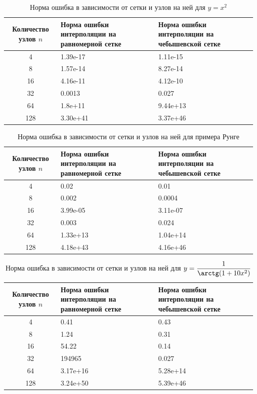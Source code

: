 \documentclass{article}
\begin{document}
    
    \begin{table}[H]
        \centering
        \caption{Норма ошибка в зависимости от сетки и узлов на ней для $y = x^2$}
        \begin{tabular}{|c|p{5cm}|p{5cm}|}
            \hline
            Количество узлов $n$ & Норма ошибки интерполяции
            на равномерной сетке & Норма ошибки интерполяции
            на чебышевской сетке \\
            \hline 
            4 & 1.39e-17 & 1.11e-15 \\ \hline
            8 & 1.57e-14 & 8.27e-14\\ \hline
            16 &4.16e-11 & 4.12e-10\\ \hline
            32 & 0.0013 &  0.027\\ \hline
            64 &1.8e+11 & 9.44e+13\\ \hline
            128 &3.30e+41&   3.37e+46\\ \hline
        \end{tabular}
    \end{table}
    \begin{table}[H]
        \centering
        \caption{Норма ошибка в зависимости от сетки и узлов на ней для примера Рунге}
        \begin{tabular}{|c|p{5cm}|p{5cm}|}
            \hline
            Количество узлов $n$ & Норма ошибки интерполяции
            на равномерной сетке & Норма ошибки интерполяции
            на чебышевской сетке \\
            \hline 
            4 & 0.02 &   0.01 \\ \hline
            8 & 0.002 & 0.0004\\ \hline
            16 &3.99e-05 & 3.11e-07\\ \hline
            32 &  0.003 &  0.024\\ \hline
            64 &1.33e+13 & 1.04e+14\\ \hline
            128 & 4.18e+43&   4.16e+46\\ \hline
        \end{tabular}
    \end{table}
    \begin{table}[H]
        \centering
        \caption{Норма ошибка в зависимости от сетки и узлов на ней для $y = \dfrac{1}{\arctg (1+10x^2)}$}
        \begin{tabular}{|c|p{5cm}|p{5cm}|}
            \hline
            Количество узлов $n$ & Норма ошибки интерполяции
            на равномерной сетке & Норма ошибки интерполяции
            на чебышевской сетке \\
            \hline 
            4 & 0.41 &  0.43 \\ \hline
            8 &  1.24 & 0.31\\ \hline
            16 &54.22 & 0.14\\ \hline
            32 & 194965 & 0.027\\ \hline
            64 &3.17e+16 &  5.28e+14\\ \hline
            128 &  3.24e+50&  5.39e+46\\ \hline
        \end{tabular}
    \end{table}
\end{document}
